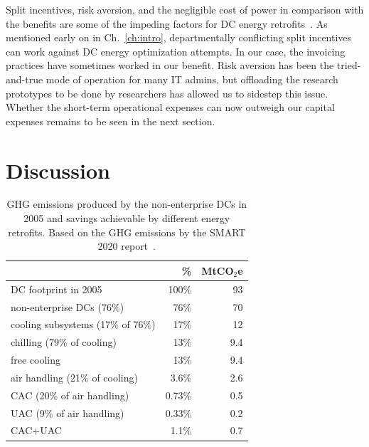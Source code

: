 \documentclass[officiallayout]{tktla}
\begin{document}
Split incentives, risk aversion, and the negligible cost of power in
comparison with the benefits are some of the impeding factors for DC energy
retrofits~\cite{EPA2007}. As mentioned early on in Ch.~\ref{ch:intro},
departmentally conflicting split incentives can work against DC energy
optimization attempts. In our case, the invoicing practices have sometimes
worked in our benefit. Risk aversion has been the tried-and-true mode of
operation for many IT admins, but offloading the research prototypes to be
done by researchers has allowed us to sidestep this issue.  Whether the
short-term operational expenses can now outweigh our capital expenses remains
to be seen in the next section.



\section{Discussion}
\label{sec:discussion}

\begin{table}
  \centering
  \begin{tabular}{l|r|r} \hline
& \% & MtCO$_2$e \\
 \hline
DC footprint in 2005 & 100\% & 93 \\
non-enterprise DCs (76\%) & 76\% & 70 \\
cooling subsystems (17\% of 76\%) & 17\% & 12 \\
chilling (79\% of cooling) & 13\% & 9.4 \\
free cooling & 13\%  & 9.4 \\
air handling (21\% of cooling) & 3.6\% & 2.6 \\
CAC (20\% of air handling) & 0.73\% & 0.5 \\
UAC (9\% of air handling) & 0.33\% & 0.2  \\
CAC+UAC & 1.1\% & 0.7 \\
 \hline
  \end{tabular}
  \caption{GHG emissions produced by the non-enterprise DCs in 2005
  and savings achievable by different energy retrofits. Based on the 
  GHG emissions by the SMART 2020 report~\cite{Webb2008}.}
  \label{tab:GHG_savings}
\end{table}
\end{document}
